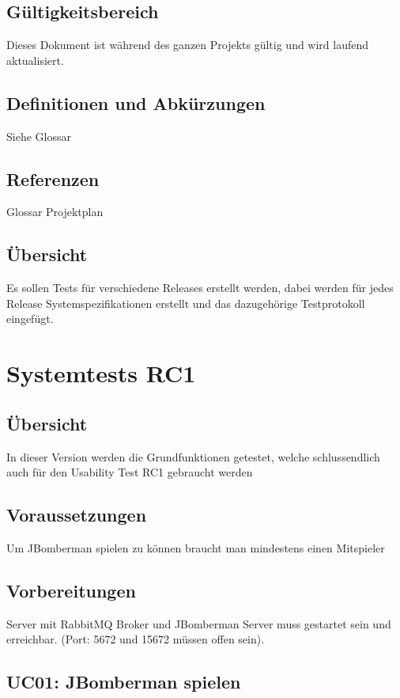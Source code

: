\documentclass[11pt]{scrartcl}
\begin{document}
\subsection{Gültigkeitsbereich}
Dieses Dokument ist während des ganzen Projekts gültig und wird laufend aktualisiert.
\subsection{Definitionen und Abkürzungen}
Siehe Glossar
\subsection{Referenzen}
Glossar
Projektplan
\subsection{Übersicht}
Es sollen Tests für verschiedene Releases erstellt werden, dabei werden für 
jedes Release Systemspezifikationen erstellt und das dazugehörige Testprotokoll 
eingefügt.
\section{Systemtests RC1}
\subsection{Übersicht}
In dieser Version werden die Grundfunktionen getestet, welche schlussendlich auch 
für den Usability Test RC1 gebraucht werden
\subsection{Voraussetzungen}
Um JBomberman spielen zu können braucht man mindestens einen Mitspieler
\subsection{Vorbereitungen}
Server mit RabbitMQ Broker und JBomberman Server muss gestartet sein und 
erreichbar. 
(Port: 5672 und 15672 müssen offen sein).
\subsection{UC01: JBomberman spielen}
\end{document}
